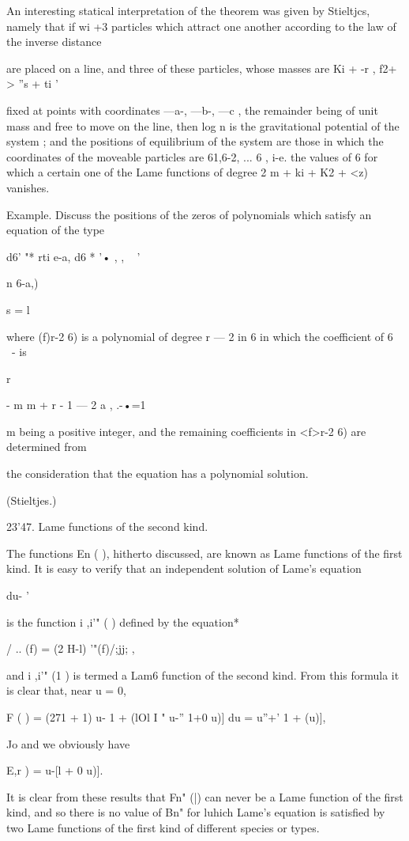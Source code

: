 {{{{{{{An interesting statical interpretation of the theorem was given by Stieltjcs, namely 
that if wi +3 particles which attract one another according to the law of the inverse distance 

are placed on a line, and three of these particles, whose masses are Ki + -r , f2+ > ''s + ti  '  

fixed at points with coordinates —a-, —b-, —c , the remainder being of unit mass and free 
to move on the line, then log n is the gravitational potential of the system ; and the 
positions of equilibrium of the system are those in which the coordinates of the moveable 
particles are 61,6-2, ... 6 , i-e. the values of 6 for which a certain one of the Lame functions 
of degree 2  m + ki + K2 + <z) vanishes. 

Example. Discuss the positions of the zeros of polynomials which satisfy an equation 
of the type 

d6'  "*  rti e-a, d6  *  '• ,  ,  ~ ' 

n  6-a,) 

s = l 

where (f)r-2 6) is a polynomial of degree r — 2 in 6 in which the coefficient of 6 ~- is 

r 

- m  m + r - 1 — 2 a   , 
.-•=1 

m being a positive integer, and the remaining coefficients in <f>r-2 6) are determined from 

the consideration that the equation has a polynomial solution. 

(Stieltjes.) 

23'47. Lame functions of the second kind. 

The functions En  ( ), hitherto discussed, are known as Lame functions 
of the first kind. It is easy to verify that an independent solution of Lame's 
equation 

du-   ' 

is the function i ,i'" ( ) defined by the equation* 

/ .. (f) = (2 H-l)  '"(f)/;jj; , 

and i ,i'" (1 ) is termed a Lam6 function of the second kind. 
From this formula it is clear that, near u = 0, 

F  ( ) = (271 + 1) u-   1 + (lOl I " u-''  1+0  u)] du = u''+'  1 + (u)], 

Jo 
and we obviously have 

E,r  ) = u-[l + 0 u)]. 

It is clear from these results that Fn"  (|) can never be a Lame function of 
the first kind, and so there is no value of Bn"  for luhich Lame's equation is 
satisfied by two Lame functions of the first kind of different species or types. 

}}}}}}}
